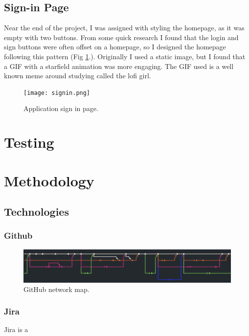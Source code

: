 \documentclass[conference]{IEEEtran}
\begin{document}
\subsection{Sign-in Page}
Near the end of the project, I was assigned with styling the homepage, as it was empty with two buttons. From some quick research I found that the login and sign buttons were often offset on a homepage, so I designed the homepage following this pattern (Fig \ref{signin}.). Originally I used a static image, but I found that a GIF with a starfield animation was more engaging. The GIF used is a well known meme around studying called the lofi girl.

\begin{figure}[htbp]
\centerline{\texttt{[image: signin.png]}}
\caption{Application sign in page.}
\label{signin}
\end{figure}

\section{Testing}



\section{Methodology}

\subsection{Technologies}
\subsubsection{Github}

\begin{figure}[htbp]
\centerline{\includegraphics[width = \linewidth]{github-network.png}}
\caption{GitHub network map.}
\label{fig}
\end{figure}

\subsubsection{Jira}
Jira is a 
\end{document}
